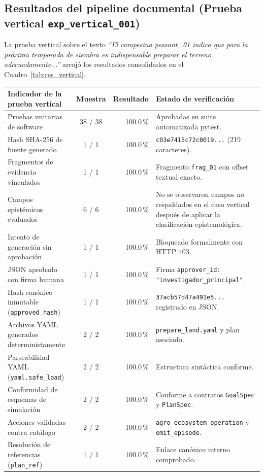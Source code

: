 \documentclass[11pt,a4paper]{article}
\begin{document}
\subsection{Resultados del pipeline documental (Prueba vertical \texttt{exp\_vertical\_001})}
La prueba vertical sobre el texto \textit{``El campesino peasant\_01 indica que para la próxima temporada de siembra es indispensable preparar el terreno adecuadamente...''} arrojó los resultados consolidados en el Cuadro~\ref{tab:res_vertical}.

\begin{table}[H]
\centering
\small
\begin{tabularx}{\textwidth}{lcrX}
\toprule
\textbf{Indicador de la prueba vertical} & \textbf{Muestra} & \textbf{Resultado} & \textbf{Estado de verificación} \\
\midrule
Pruebas unitarias de software & 38 / 38 & 100.0\,\% & Aprobadas en suite automatizada pytest. \\
Hash SHA-256 de fuente generado & 1 / 1 & 100.0\,\% & \texttt{c03e7415c72c0019...} (219 caracteres). \\
Fragmentos de evidencia vinculados & 1 / 1 & 100.0\,\% & Fragmento \texttt{frag\_01} con offset textual exacto. \\
Campos epistémicos evaluados & 6 / 6 & 100.0\,\% & No se observaron campos no respaldados en el caso vertical después de aplicar la clasificación epistemológica. \\
Intento de generación sin aprobación & 1 / 1 & 100.0\,\% & Bloqueado formalmente con HTTP 403. \\
JSON aprobado con firma humana & 1 / 1 & 100.0\,\% & Firma \texttt{approver\_id: "investigador\_principal"}. \\
Hash canónico inmutable (\texttt{approved\_hash}) & 1 / 1 & 100.0\,\% & \texttt{37acb57d47a491e5...} registrado en JSON. \\
Archivos YAML generados deterministamente & 2 / 2 & 100.0\,\% & \texttt{prepare\_land.yaml} y plan asociado. \\
Parseabilidad YAML (\texttt{yaml.safe\_load}) & 2 / 2 & 100.0\,\% & Estructura sintáctica conforme. \\
Conformidad de esquemas de simulación & 2 / 2 & 100.0\,\% & Conforme a contratos \texttt{GoalSpec} y \texttt{PlanSpec}. \\
Acciones validadas contra catálogo & 2 / 2 & 100.0\,\% & \texttt{agro\_ecosystem\_operation} y \texttt{emit\_episode}. \\
Resolución de referencias (\texttt{plan\_ref}) & 1 / 1 & 100.0\,\% & Enlace canónico interno comprobado. \\

\end{tabularx}
\end{table}
\end{document}
